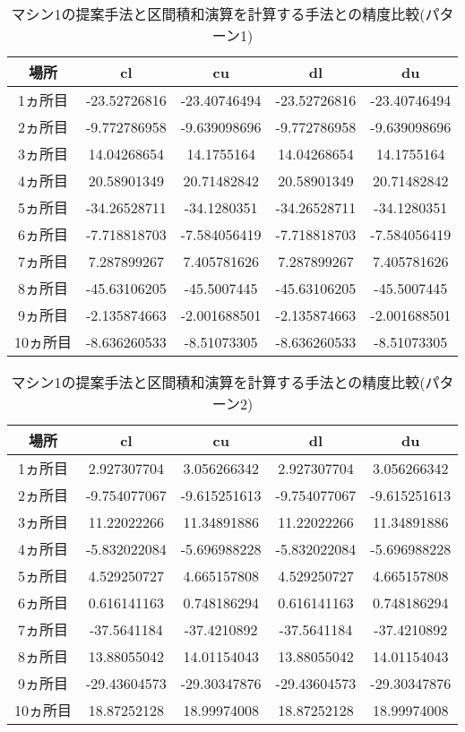 \documentclass[11pt,a4paper]{jsreport}
\theoremstyle{definition}
\begin{document}
\begin{table}[H]
\centering
\begin{tabular}{|c|c|c|c|c|}
\hline
場所 & cl & cu & dl & du \\ \hline
1ヵ所目 & -23.52726816 & -23.40746494 & -23.52726816 & -23.40746494 \\ \hline
2ヵ所目 & -9.772786958 & -9.639098696 & -9.772786958 & -9.639098696 \\ \hline
3ヵ所目 & 14.04268654 & 14.1755164 & 14.04268654 & 14.1755164 \\ \hline
4ヵ所目 & 20.58901349 & 20.71482842 & 20.58901349 & 20.71482842 \\ \hline
5ヵ所目 & -34.26528711 & -34.1280351 & -34.26528711 & -34.1280351 \\ \hline
6ヵ所目 & -7.718818703 & -7.584056419 & -7.718818703 & -7.584056419 \\ \hline
7ヵ所目 & 7.287899267 & 7.405781626 & 7.287899267 & 7.405781626 \\ \hline
8ヵ所目 & -45.63106205 & -45.5007445 & -45.63106205 & -45.5007445 \\ \hline
9ヵ所目 & -2.135874663 & -2.001688501 & -2.135874663 & -2.001688501 \\ \hline
10ヵ所目 & -8.636260533 & -8.51073305 & -8.636260533 & -8.51073305 \\ \hline
\end{tabular}
\caption{マシン1の提案手法と区間積和演算を計算する手法との精度比較(パターン1)}
\end{table}

\begin{table}[H]
\centering
\begin{tabular}{|c|c|c|c|c|}
\hline
場所 & cl & cu & dl & du \\ \hline
1ヵ所目 & 2.927307704 & 3.056266342 & 2.927307704 & 3.056266342 \\ \hline
2ヵ所目 & -9.754077067 & -9.615251613 & -9.754077067 & -9.615251613 \\ \hline
3ヵ所目 & 11.22022266 & 11.34891886 & 11.22022266 & 11.34891886 \\ \hline
4ヵ所目 & -5.832022084 & -5.696988228 & -5.832022084 & -5.696988228 \\ \hline
5ヵ所目 & 4.529250727 & 4.665157808 & 4.529250727 & 4.665157808 \\ \hline
6ヵ所目 & 0.616141163 & 0.748186294 & 0.616141163 & 0.748186294 \\ \hline
7ヵ所目 & -37.5641184 & -37.4210892 & -37.5641184 & -37.4210892 \\ \hline
8ヵ所目 & 13.88055042 & 14.01154043 & 13.88055042 & 14.01154043 \\ \hline
9ヵ所目 & -29.43604573 & -29.30347876 & -29.43604573 & -29.30347876 \\ \hline
10ヵ所目 & 18.87252128 & 18.99974008 & 18.87252128 & 18.99974008 \\ \hline
\end{tabular}
\caption{マシン1の提案手法と区間積和演算を計算する手法との精度比較(パターン2)}
\end{table}
\end{document}
